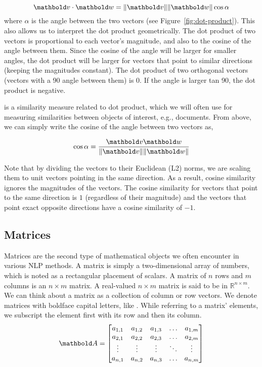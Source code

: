\[
  \vect{v}\cdot\vect{w} = \norm{\vect{v}}\norm{\vect{w}} \cos \alpha
\]
where $\alpha$ is the angle between the two vectors
(see Figure~\ref{fig:dot-product}).
This also allows us to interpret the dot product geometrically.
The dot product of two vectors is proportional to each vector's magnitude,
and also to the cosine of the angle between them.
Since the cosine of the angle will be larger for smaller angles,
the dot product will be larger for vectors that point to similar directions
(keeping the magnitudes constant).
The dot product of two orthogonal vectors
(vectors with a \num{90}\textdegree{} angle between them)
is \num{0}.
If the angle is larger tan \num{90}\textdegree{},
the dot product is negative.



 is a similarity measure related to dot product,
which we will often use for measuring similarities between objects of interest,
e.g., documents.
From above, we can simply write the cosine of the angle between two vectors as,

\[ \cos\alpha = \frac{\vect{v}\vect{w}}{\norm{\vect{v}}\norm{\vect{w}}} \]

Note that by dividing the vectors to their Euclidean (L2) norms,
we are scaling them to unit vectors pointing in the same direction.
As a result, cosine similarity ignores the magnitudes of the vectors.
The cosine similarity for vectors that point to the same direction is $1$
(regardless of their magnitude) and the vectors
that point exact opposite directions have a cosine similarity of $-1$.


\subsection{Matrices}

Matrices are the second type of mathematical objects we often encounter in various NLP methods.
A matrix is simply a two-dimensional array of numbers,
which is noted as a rectangular placement of scalars.
A matrix of $n$ rows and $m$ columns is an $n \times m$ matrix.
A real-valued $n \times m$ matrix is said to be in $\mathbb{R}^{n\times m}$.
We can think about a matrix as a collection of column or row vectors.
We denote matrices with boldface capital letters, like .
While referring to a matrix' elements,
we subscript the element first with its row and then its column.
  \[ \vect{A} =
    \begin{bmatrix}
      a_{1,1} & a_{1,2} & a_{1,3} & \ldots & a_{1,m} \\
      a_{2,1} & a_{2,2} & a_{2,3} & \ldots & a_{2,m} \\
      \vdots  & \vdots  & \vdots  & \ddots & \vdots \\
      a_{n,1} & a_{n,2} & a_{n,3} & \ldots & a_{n,m} \\
    \end{bmatrix}
  \]

